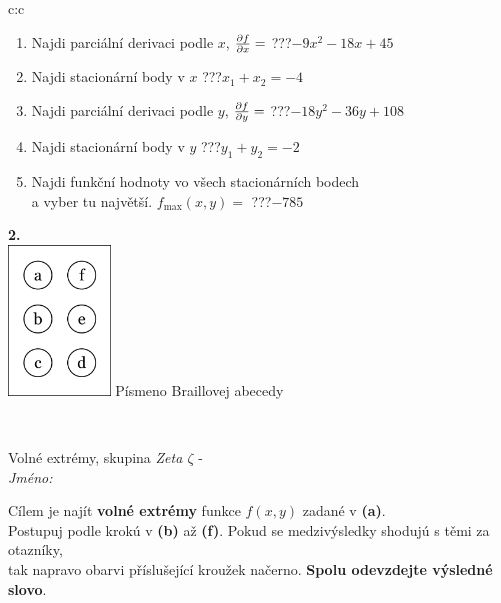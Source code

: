 \documentclass[10pt]{report}
\begin{document}
\begin{tabular}{c:c}
\begin{minipage}[c][104.5mm][t]{0.5\linewidth}
\begin{center}
\begin{minipage}{0.79\linewidth}
\begin{center}
\begin{varwidth}{\linewidth}
\begin{enumerate}
\item Najdi parciální derivaci podle $x$, $\pdv{f}{x}=$\quad \dotfill\; ???\;\dotfill \quad $-9x^2-18x+45$
\item Najdi stacionární body v $x$\quad \dotfill\; ???\;\dotfill \quad $x_1+x_2=-4$
\item Najdi parciální derivaci podle $y$, $\pdv{f}{y}=$\quad \dotfill\; ???\;\dotfill \quad $-18y^2-36y+108$
\item Najdi stacionární body v $y$\quad \dotfill\; ???\;\dotfill \quad $y_1+y_2=-2$
\item Najdi funkční hodnoty vo všech stacionárních bodech \\ \phantom{xxxxxx} a vyber tu najvětší. $f_{\text{max}}(x,y)=$\quad \dotfill\; ???\;\dotfill \quad $-785$
\end{enumerate}
\end{varwidth}
\end{center}
\end{minipage}
\begin{minipage}{0.20\linewidth}
\begin{center}
{\Huge\bfseries 2.} \\[2mm]
\includegraphics[height=40mm]{../images/braille.png}
{\small Písmeno Braillovej abecedy}
\end{center}
\end{minipage}
\end{center}
\end{minipage}
\\ \hdashline
\begin{minipage}[c][104.5mm][t]{0.5\linewidth}
\begin{center}
\vspace{7mm}
{\huge Volné extrémy, skupina \textit{Zeta $\zeta$} -}\\[5mm]
\textit{Jméno:}\phantom{xxxxxxxxxxxxxxxxxxxxxxxxxxxxxxxxxxxxxxxxxxxxxxxxxxxxxxxxxxxxxxxxx}\\[5mm]
\begin{minipage}{0.95\linewidth}
\begin{center}
Cílem je najít \textbf{volné extrémy} funkce $f(x,y)$ zadané v \textbf{(a)}.\\Postupuj podle krokú v \textbf{(b)} až \textbf{(f)}. Pokud se medzivýsledky shodujú s těmi za otazníky,\\tak napravo obarvi příslušející kroužek načerno. \textbf{Spolu odevzdejte výsledné slovo}.

\end{center}
\end{minipage}
\end{center}
\end{minipage}
\end{tabular}
\end{document}
